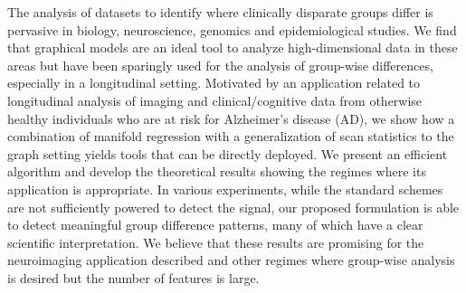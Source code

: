 The analysis of datasets to identify where clinically disparate groups differ is pervasive in biology, neuroscience, genomics and epidemiological studies. 
We find that graphical models are an ideal tool to analyze high-dimensional data in these areas but have been sparingly used for the analysis of 
group-wise differences, especially in a longitudinal setting. 
Motivated by an application related to longitudinal analysis of imaging and clinical/cognitive data from otherwise healthy individuals 
who are at risk for Alzheimer's disease (AD), we show how a combination of manifold regression with a generalization of scan statistics to the graph setting yields 
tools that can be directly deployed. 
We present an efficient algorithm and develop the theoretical results showing the regimes where its application is appropriate. 
In various experiments, while the standard schemes are not sufficiently powered to detect the signal, our proposed formulation is able to 
detect meaningful group difference patterns, many of which have a clear scientific interpretation. 
We believe that these results are promising for the neuroimaging application 
described and other regimes where group-wise analysis is desired but the number of features is large. 